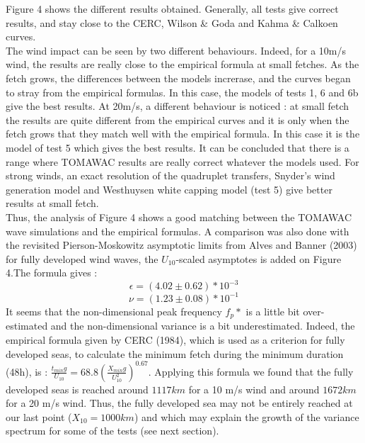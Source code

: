 Figure 4 shows the different results obtained. Generally, all tests give correct results, and stay close to the CERC, Wilson \& Goda and Kahma \& Calkoen curves.\\
The wind impact can be seen by two different behaviours. Indeed, for a 10m/s wind, the results are really close to the empirical formula at small fetches. As the fetch grows, the differences between the models increrase, and the curves began to stray from the empirical formulas. In this case, the models of tests 1, 6 and 6b give the best results. At 20m/s, a different behaviour is noticed : at small fetch the results are quite different from the empirical curves and it is only when the fetch grows that they match well with the empirical formula. In this case it is the model of test 5 which gives the best results. It can be concluded that there is a range where TOMAWAC results are really correct whatever the models used. For strong winds, an exact resolution of the quadruplet transfers, Snyder's wind generation model and Westhuysen white capping model (test 5) give better results at small fetch. \\
Thus, the analysis of Figure 4 shows a good matching between the  TOMAWAC wave simulations and the empirical formulas. A comparison was also done with the revisited Pierson-Moskowitz asymptotic limits from Alves and Banner (2003) for fully developed wind waves, the $U_{10}$-scaled asymptotes is added on Figure 4.The formula gives : 
\[\epsilon = (4.02 \pm 0.62)*10^{-3}\]
\[\nu = (1.23 \pm 0.08)* 10^{-1}\]
 It seems that the non-dimensional peak frequency $f_p*$ is a little bit over-estimated and the non-dimensional variance is a bit underestimated. Indeed, the empirical formula given by CERC (1984), which is used as a criterion for fully developed seas, to calculate the minimum fetch during the minimum duration (48h), is : $\frac{t_{min} g}{U_{10}} = 68.8 (\frac{X_{min} g}{U_{10}^2})^{0.67}$. Applying this formula we found that the fully developed seas is reached around $1 117 km$ for a 10 m/s wind and around $1 672 km$ for a 20 m/s wind. Thus, the fully developed sea may not be entirely reached at our last point ($X_{10} = 1000km$) and which may explain the growth of the variance spectrum for some of the tests (see next section). 

